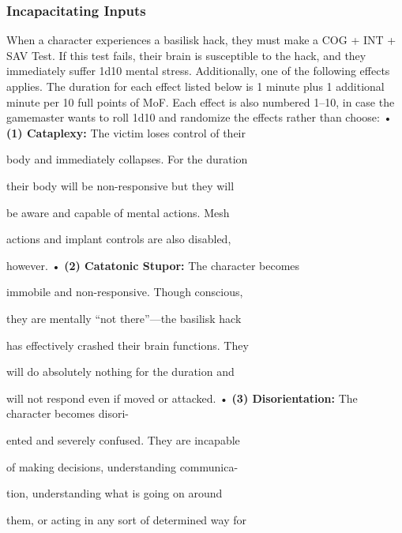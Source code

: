 \subsubsection{Incapacitating Inputs}

When a character experiences a basilisk hack, they 
must make a COG + INT + SAV Test. If this test 
fails, their brain is susceptible to the hack, and they 
immediately suffer 1d10 mental stress. Additionally, 
one of the following effects applies. The duration for 
each effect listed below is 1 minute plus 1 additional 
minute per 10 full points of MoF. Each effect is also 
numbered 1–10, in case the gamemaster wants to roll 
1d10 and randomize the effects rather than choose:
•  \textbf{(1) Cataplexy: }The victim loses control of their 

body and immediately collapses. For the duration 

their body will be non-responsive but they will 

be aware and capable of mental actions. Mesh 

actions and implant controls are also disabled, 

however.
•  \textbf{(2) Catatonic Stupor:} The character becomes 

immobile and non-responsive. Though conscious, 

they are mentally ``not there''—the basilisk hack 

has effectively crashed their brain functions. They 

will do absolutely nothing for the duration and 

will not respond even if moved or attacked.
•  \textbf{(3) Disorientation:} The character becomes disori-

ented and severely confused. They are incapable 

of making decisions, understanding communica-

tion, understanding what is going on around 

them, or acting in any sort of determined way for 

